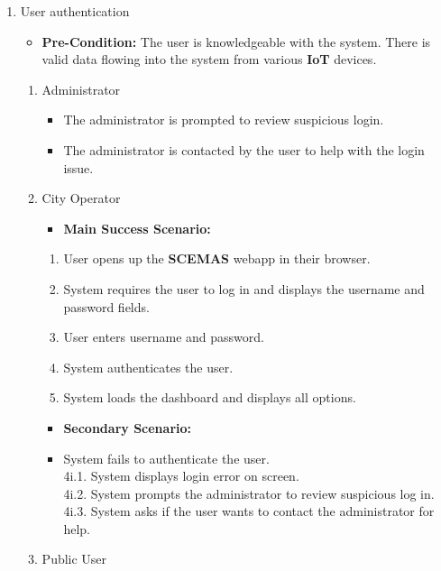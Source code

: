 \documentclass[]{article}
\begin{document}
\begin{enumerate}[{\bf BE1.}]
	\item User authentication
		\begin{itemize}
			\item[] {\bf Pre-Condition:} The user is knowledgeable with the system. There is valid data flowing into the system from various \textbf{IoT} devices.
		\end{itemize}
		\begin{enumerate}[{\bf VP1.}]
		\item Administrator
			\begin{itemize}
				\item[4i.2.] The administrator is prompted to review suspicious login.
				\item[4i.3.] The administrator is contacted by the user to help with the login issue.
			\end{itemize}
		\item City Operator
			\begin{itemize}
				\item[] {\bf Main Success Scenario:}
			\end{itemize}
			\begin{enumerate}[1.]
				\item User opens up the \textbf{SCEMAS} webapp in their browser.
				\item System requires the user to log in and displays the username and password fields.
				\item User enters username and password.
				\item System authenticates the user.
				\item System loads the dashboard and displays all options.
			\end{enumerate}
			\begin{itemize}
				\item[] {\bf Secondary Scenario:}
				\item[4i.] System fails to authenticate the user. \\
				\hspace{1cm}4i.1. System displays login error on screen. \\
				\hspace{1cm}4i.2. System prompts the administrator to review suspicious log in. \\
				\hspace{1cm}4i.3. System asks if the user wants to contact the administrator for help.
			\end{itemize}
		\item Public User \\

\end{enumerate}
\end{enumerate}
\end{document}
